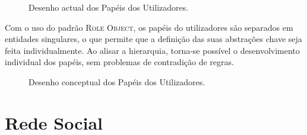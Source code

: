 \documentclass[9pt,a4paper]{extarticle}
\begin{document}
\begin{multicols}{2}

\begin{figure}[H]
  \caption{Desenho actual dos Papéis dos Utilizadores.}
  \label{fig:user_roles_current}
\end{figure}


Com o uso do padrão \textsc{Role Object}, os papéis do utilizadores são separados em entidades singulares, o que permite que a definição das suas abstrações chave seja feita individualmente. Ao alisar a hierarquia, torna-se possível o desenvolvimento individual dos papéis, sem problemas de contradição de regras.

\begin{figure}[H]
  \caption{Desenho conceptual dos Papéis dos Utilizadores.}
  \label{fig:user_roles_conceptual}
\end{figure}

\section{Rede Social}\label{sec:social_network}



\end{multicols}
\end{document}
